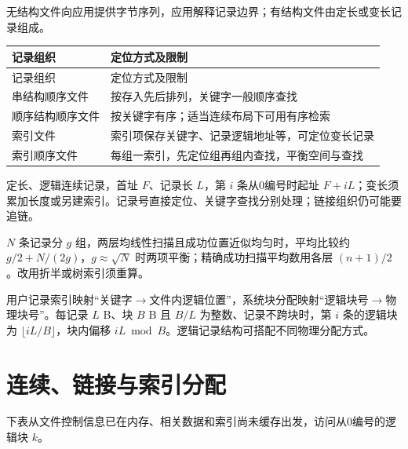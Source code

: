 无结构文件向应用提供字节序列，应用解释记录边界；有结构文件由定长或变长记录组成。

\par\smallskip
{\fontsize{9.3}{12}\selectfont\setlength{\tabcolsep}{2.5pt}\setlength{\LTleft}{0pt}\setlength{\LTright}{0pt}
\begin{longtable}{@{}>{\raggedright\arraybackslash}p{}>{\raggedright\arraybackslash}p{}@{}}
\toprule
记录组织 & 定位方式及限制 \\

\midrule\endfirsthead\toprule
记录组织 & 定位方式及限制 \\

\midrule\endhead\bottomrule\endfoot
串结构顺序文件 & 按存入先后排列，关键字一般顺序查找 \\

顺序结构顺序文件 & 按关键字有序；适当连续布局下可用有序检索 \\

索引文件 & 索引项保存关键字、记录逻辑地址等，可定位变长记录 \\

索引顺序文件 & 每组一索引，先定位组再组内查找，平衡空间与查找 \\

\end{longtable}}
\par\smallskip

定长、逻辑连续记录，首址 \(F\)、记录长 \(L\)，第 \(i\) 条从0编号时起址 \(F+iL\)；变长须累加长度或另建索引。记录号直接定位、关键字查找分别处理；链接组织仍可能要追链。

\(N\) 条记录分 \(g\) 组，两层均线性扫描且成功位置近似均匀时，平均比较约 \(g/2+N/(2g)\)，\(g\approx\sqrt N\) 时两项平衡；精确成功扫描平均数用各层 \((n+1)/2\)。改用折半或树索引须重算。

用户记录索引映射“关键字\ensuremath{\to}文件内逻辑位置”，系统块分配映射“逻辑块号\ensuremath{\to}物理块号”。每记录 \(L\) B、块 \(B\) B 且 \(B/L\) 为整数、记录不跨块时，第 \(i\) 条的逻辑块为 \(\lfloor iL/B\rfloor\)，块内偏移 \(iL\bmod B\)。逻辑记录结构可搭配不同物理分配方式。

\section{连续、链接与索引分配}\label{OS04-allocation}

下表从文件控制信息已在内存、相关数据和索引尚未缓存出发，访问从0编号的逻辑块 \(k\)。

